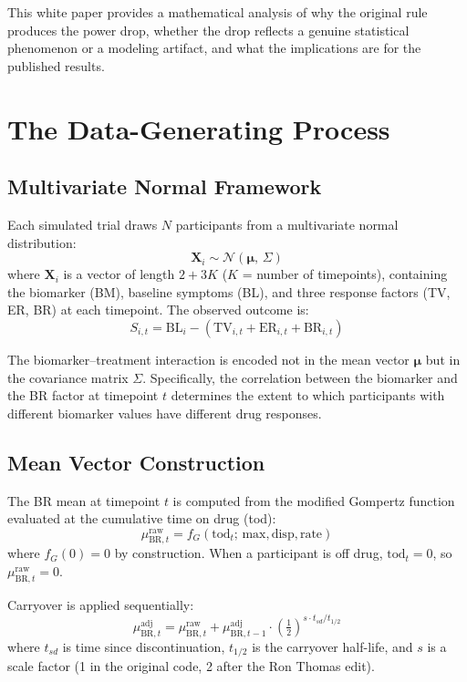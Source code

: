\documentclass[11pt]{article}
\begin{document}
This white paper provides a mathematical analysis of why the
original rule produces the power drop, whether the drop
reflects a genuine statistical phenomenon or a modeling
artifact, and what the implications are for the published
results.

\section{The Data-Generating Process}

\subsection{Multivariate Normal Framework}

Each simulated trial draws $N$ participants from a multivariate
normal distribution:
\[
\mathbf{X}_i \sim \mathcal{N}(\boldsymbol{\mu},\, \Sigma)
\]
where $\mathbf{X}_i$ is a vector of length $2 + 3K$ ($K$ =
number of timepoints), containing the biomarker (BM), baseline
symptoms (BL), and three response factors (TV, ER, BR) at each
timepoint. The observed outcome is:
\[
S_{i,t} = \text{BL}_i -
  (\text{TV}_{i,t} + \text{ER}_{i,t} + \text{BR}_{i,t})
\]

The biomarker--treatment interaction is encoded not in the
mean vector $\boldsymbol{\mu}$ but in the covariance matrix
$\Sigma$. Specifically, the correlation between the biomarker
and the BR factor at timepoint $t$ determines the extent to
which participants with different biomarker values have
different drug responses.

\subsection{Mean Vector Construction}

The BR mean at timepoint $t$ is computed from the modified
Gompertz function evaluated at the cumulative time on drug
(tod):
\[
\mu_{\text{BR},t}^{\text{raw}} =
  f_G(\text{tod}_t;\, \text{max}, \text{disp}, \text{rate})
\]
where $f_G(0) = 0$ by construction. When a participant is off
drug, $\text{tod}_t = 0$, so
$\mu_{\text{BR},t}^{\text{raw}} = 0$.

Carryover is applied sequentially:
\[
\mu_{\text{BR},t}^{\text{adj}} =
  \mu_{\text{BR},t}^{\text{raw}} +
  \mu_{\text{BR},t-1}^{\text{adj}} \cdot
  \left(\tfrac{1}{2}\right)^{s \cdot t_{sd} / t_{1/2}}
\]
where $t_{sd}$ is time since discontinuation, $t_{1/2}$ is
the carryover half-life, and $s$ is a scale factor (1 in the
original code, 2 after the Ron Thomas edit).
\end{document}
